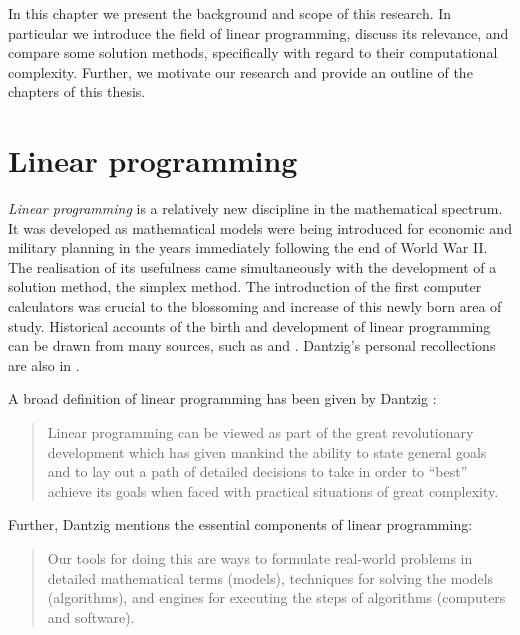 
%
%
\label{ch:Introduction}

In this chapter we present the background and scope of
this research. In particular we introduce the field of linear programming,
discuss its relevance, and compare some solution methods, specifically
with regard to their computational complexity.
Further, we motivate our research and provide an outline of the chapters
of this thesis.

%
%
\section{Linear programming}

{\em Linear programming} is a relatively new discipline in the mathematical
spectrum.
It was developed as mathematical models were being introduced for
economic and military planning in the years immediately following
the end of World War II.
The realisation of its usefulness came simultaneously with the development
of a solution method, the simplex method.
The introduction of the first computer calculators was crucial to
the blossoming and increase of this newly born area of study. 
Historical accounts of the birth and development of linear programming 
can be drawn from many sources, such as \cite[Chapter~2]{Dantzig63} and 
\cite{Schrijver86}. Dantzig's personal recollections are also
in \cite{Dantzig02}.

A broad definition of linear programming has been given by 
Dantzig \cite{Dantzig02}:
\begin{quotation}
Linear programming can be viewed as part of the great revolutionary 
development which has given mankind the ability to state general goals
and to lay out a path of detailed decisions to take in order to ``best''
achieve its goals when faced with practical situations of great complexity.
\end{quotation}

Further, Dantzig \cite{Dantzig02} mentions the essential 
components of linear programming:
\begin{quotation}
Our tools for doing this are ways to formulate real-world problems in
detailed mathematical terms (models), techniques for solving the models
(algorithms), and engines for executing the steps of algorithms
(computers and software).
\end{quotation}

